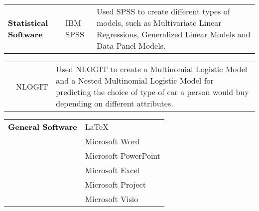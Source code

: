 \begin{tabular*}{1\textwidth}{p{} p{} p{9.8cm} }
\textcolor{black}{\textbf{Statistical Software}} & \textcolor{bgcol}{IBM SPSS} & Used SPSS to create different types of models, such as Multivariate Linear Regressions, Generalized Linear Models and Data Panel Models. \\
\end{tabular*}
\begin{tabular*}{1\textwidth}{p{} p{} p{9.8cm} }
& \textcolor{bgcol}{NLOGIT} & Used NLOGIT to create a Multinomial Logistic Model and a Nested Multinomial Logistic Model for predicting the choice of type of car a person would buy depending on different attributes. 
\end{tabular*}

\begin{tabular*}{1\textwidth}{p{} p{}}
\textcolor{black}{\textbf{General Software}} & \textcolor{bgcol}{\LaTeX} \\
& \textcolor{bgcol}{Microsoft Word}  \\
& \textcolor{bgcol}{Microsoft PowerPoint}  \\
& \textcolor{bgcol}{Microsoft Excel}  \\
& \textcolor{bgcol}{Microsoft Project}  \\
& \textcolor{bgcol}{Microsoft Visio} \\
\end{tabular*}


		 






